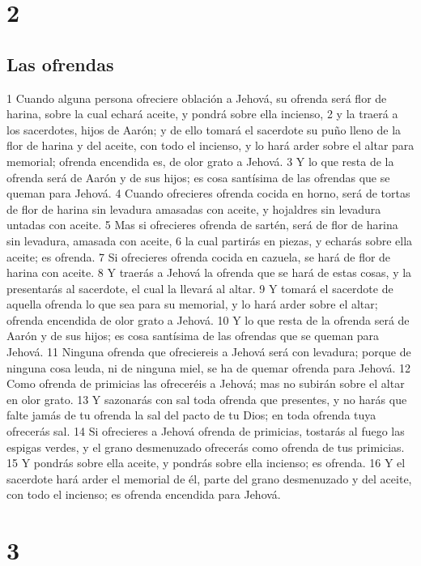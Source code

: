 \chapter{2}

\section*{Las ofrendas}

1 Cuando alguna persona ofreciere oblación a Jehová, su ofrenda será flor de harina, sobre la cual echará aceite, y pondrá sobre ella incienso,
2 y la traerá a los sacerdotes, hijos de Aarón; y de ello tomará el sacerdote su puño lleno de la flor de harina y del aceite, con todo el incienso, y lo hará arder sobre el altar para memorial; ofrenda encendida es, de olor grato a Jehová.
3 Y lo que resta de la ofrenda será de Aarón y de sus hijos; es cosa santísima de las ofrendas que se queman para Jehová.
4 Cuando ofrecieres ofrenda cocida en horno, será de tortas de flor de harina sin levadura amasadas con aceite, y hojaldres sin levadura untadas con aceite.
5 Mas si ofrecieres ofrenda de sartén, será de flor de harina sin levadura, amasada con aceite,
6 la cual partirás en piezas, y echarás sobre ella aceite; es ofrenda.
7 Si ofrecieres ofrenda cocida en cazuela, se hará de flor de harina con aceite.
8 Y traerás a Jehová la ofrenda que se hará de estas cosas, y la presentarás al sacerdote, el cual la llevará al altar.
9 Y tomará el sacerdote de aquella ofrenda lo que sea para su memorial, y lo hará arder sobre el altar; ofrenda encendida de olor grato a Jehová.
10 Y lo que resta de la ofrenda será de Aarón y de sus hijos; es cosa santísima de las ofrendas que se queman para Jehová.
11 Ninguna ofrenda que ofreciereis a Jehová será con levadura; porque de ninguna cosa leuda, ni de ninguna miel, se ha de quemar ofrenda para Jehová.
12 Como ofrenda de primicias las ofreceréis a Jehová; mas no subirán sobre el altar en olor grato.
13 Y sazonarás con sal toda ofrenda que presentes, y no harás que falte jamás de tu ofrenda la sal del pacto de tu Dios; en toda ofrenda tuya ofrecerás sal.
14 Si ofrecieres a Jehová ofrenda de primicias, tostarás al fuego las espigas verdes, y el grano desmenuzado ofrecerás como ofrenda de tus primicias.
15 Y pondrás sobre ella aceite, y pondrás sobre ella incienso; es ofrenda.
16 Y el sacerdote hará arder el memorial de él, parte del grano desmenuzado y del aceite, con todo el incienso; es ofrenda encendida para Jehová.

\chapter{3}

